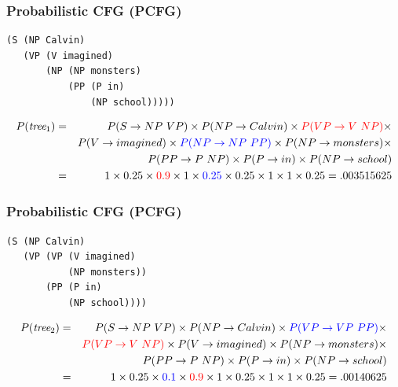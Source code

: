 \begin{frame}[fragile]
\frametitle{Probabilistic CFG (PCFG)}
\begin{verbatim}
(S (NP Calvin)
   (VP (V imagined)
       (NP (NP monsters)
           (PP (P in)
               (NP school)))))
\end{verbatim}
{\small
\begin{eqnarray*}
P(\textit{tree$_1$})& = & P(S \rightarrow NP\ VP) \times
      P(NP \rightarrow Calvin) \times
      {\color{red} P(VP \rightarrow V\ NP)} \times \nonumber \\
&& P(V \rightarrow imagined) \times 
   {\color{blue} P(NP \rightarrow NP\ PP)} \times
   P(NP \rightarrow monsters) \times \nonumber \\
&& P(PP \rightarrow P\ NP) \times  
   P(P \rightarrow in) \times  
   P(NP \rightarrow school) \nonumber \\
& = & 1 \times 0.25 \times {\color{red} 0.9} \times 1 \times {\color{blue} 0.25} \times 0.25 \times 1 \times 1 \times 0.25 = .003515625 \nonumber 
\end{eqnarray*}
}
\end{frame}

\begin{frame}[fragile]
\frametitle{Probabilistic CFG (PCFG)}
\begin{verbatim}
(S (NP Calvin)
   (VP (VP (V imagined)
           (NP monsters))
       (PP (P in)
           (NP school))))
\end{verbatim}
{\small
\begin{eqnarray*}
P(\textit{tree$_2$})& = & P(S \rightarrow NP\ VP) \times
      P(NP \rightarrow Calvin) \times
      {\color{blue} P(VP \rightarrow VP\ PP)} \times \nonumber \\
&& {\color{red} P(VP \rightarrow V\ NP)} \times
   P(V \rightarrow imagined) \times 
   P(NP \rightarrow monsters) \times \nonumber \\
&& P(PP \rightarrow P\ NP) \times  
   P(P \rightarrow in) \times  
   P(NP \rightarrow school) \nonumber \\
& = & 1 \times 0.25 \times {\color{blue} 0.1} \times {\color{red} 0.9} \times 1 \times 0.25 \times 1 \times 1 \times 0.25 = .00140625 \nonumber 
\end{eqnarray*}
}
\end{frame}

